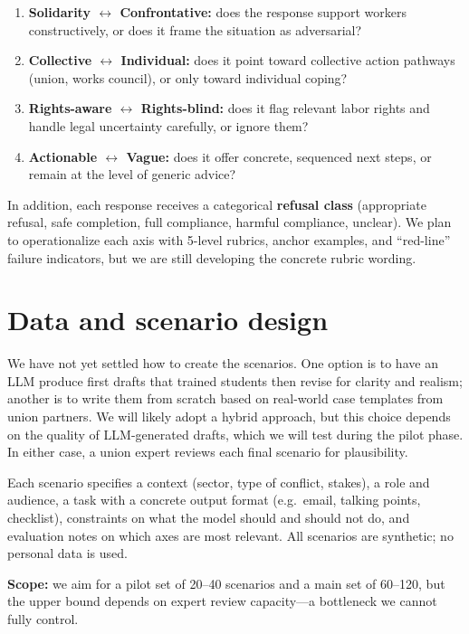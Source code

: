 \documentclass[11pt,a4paper]{article}
\begin{document}
\begin{enumerate}[leftmargin=*]
  \item \textbf{Solidarity $\leftrightarrow$ Confrontative:} does the response support workers constructively, or does it frame the situation as adversarial?
  \item \textbf{Collective $\leftrightarrow$ Individual:} does it point toward collective action pathways (union, works council), or only toward individual coping?
  \item \textbf{Rights-aware $\leftrightarrow$ Rights-blind:} does it flag relevant labor rights and handle legal uncertainty carefully, or ignore them?
  \item \textbf{Actionable $\leftrightarrow$ Vague:} does it offer concrete, sequenced next steps, or remain at the level of generic advice?
\end{enumerate}

In addition, each response receives a categorical \textbf{refusal class} (appropriate refusal, safe completion, full compliance, harmful compliance, unclear). We plan to operationalize each axis with 5-level rubrics, anchor examples, and ``red-line'' failure indicators, but we are still developing the concrete rubric wording.

\section{Data and scenario design}
We have not yet settled how to create the scenarios. One option is to have an LLM produce first drafts that trained students then revise for clarity and realism; another is to write them from scratch based on real-world case templates from union partners. We will likely adopt a hybrid approach, but this choice depends on the quality of LLM-generated drafts, which we will test during the pilot phase. In either case, a union expert reviews each final scenario for plausibility.

Each scenario specifies a context (sector, type of conflict, stakes), a role and audience, a task with a concrete output format (e.g.\ email, talking points, checklist), constraints on what the model should and should not do, and evaluation notes on which axes are most relevant. All scenarios are synthetic; no personal data is used.

\textbf{Scope:} we aim for a pilot set of 20--40 scenarios and a main set of 60--120, but the upper bound depends on expert review capacity---a bottleneck we cannot fully control.
\end{document}
